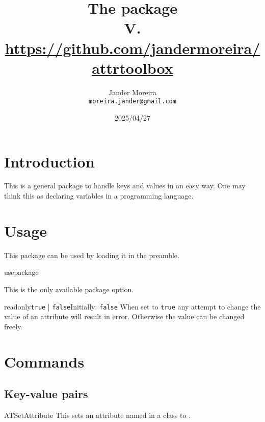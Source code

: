 \documentclass[a4paper, 11pt]{article}
\title{
    The \PackageName{attrtoolbox} package\\
    \small V.\ATVersion\\
    \normalsize\url{https://github.com/jandermoreira/attrtoolbox}
}
\author{Jander Moreira\\\small\texttt{moreira.jander@gmail.com}}
\date{2025/04/27}
\begin{document}
\maketitle
\PDPrintChanges


\section{Introduction}
This is a general package to handle keys and values in an easy way. One may think this as declaring variables in a programming language.

\section{Usage}
This package can be used by loading it in the preamble.

\begin{Macrodef}{usepackage}{}{}
\end{Macrodef}

This is the only available package option.

\begin{Optiondef}{readonly}{\texttt{true} | \texttt{false}}{Initially: \texttt{false}}
    When set to \texttt{true} any attempt to change the value of an attribute will result in error. Otherwise the value can be changed freely.
\end{Optiondef}

\begin{PDListing}
    \usepackage[readonly]{attrtoolbox}
\end{PDListing}

\section{Commands}

\subsection{Key-value pairs}

\begin{Macrodef}{ATSetAttribute}{}{}
    This sets an attribute named  in a class  to .
\end{Macrodef}
\end{document}
